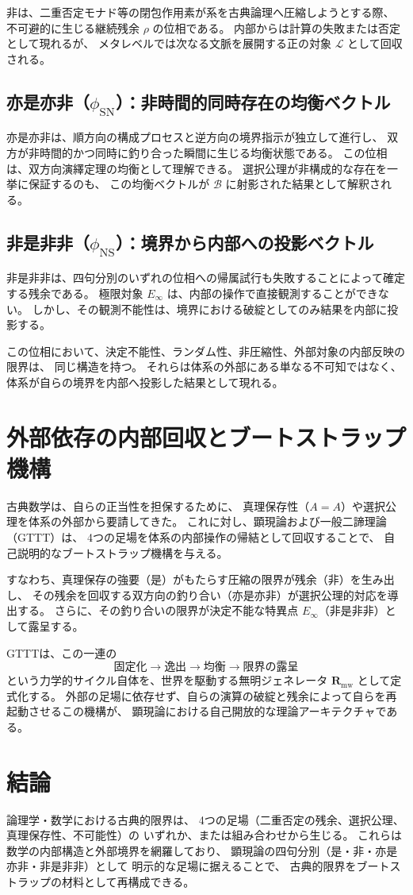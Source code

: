 \documentclass[11pt,a4paper]{ltjsarticle}
\newcommand{\phiSN}{\phi_{\text{SN}}}
\newcommand{\phiNS}{\phi_{\text{NS}}}
\newcommand{\Einfty}{E_{\infty}}
\newcommand{\Bval}{\mathcal{B}}
\newcommand{\Lhagma}{\mathcal{L}}
\newcommand{\Rmw}{\mathbf{R}_{\mathrm{mw}}}
\begin{document}
非は、二重否定モナド等の閉包作用素が系を古典論理へ圧縮しようとする際、
不可避的に生じる継続残余 $\rho$ の位相である。
内部からは計算の失敗または否定として現れるが、
メタレベルでは次なる文脈を展開する正の対象 $\Lhagma$ として回収される。

\subsection{亦是亦非（\texorpdfstring{$\phiSN$}{phiSN}）：非時間的同時存在の均衡ベクトル}

亦是亦非は、順方向の構成プロセスと逆方向の境界指示が独立して進行し、
双方が非時間的かつ同時に釣り合った瞬間に生じる均衡状態である。
この位相は、双方向演繹定理の均衡として理解できる。
選択公理が非構成的な存在を一挙に保証するのも、
この均衡ベクトルが $\Bval$ に射影された結果として解釈される。

\subsection{非是非非（\texorpdfstring{$\phiNS$}{phiNS}）：境界から内部への投影ベクトル}

非是非非は、四句分別のいずれの位相への帰属試行も失敗することによって確定する残余である。
極限対象 $\Einfty$ は、内部の操作で直接観測することができない。
しかし、その観測不能性は、境界における破綻としてのみ結果を内部に投影する。

この位相において、決定不能性、ランダム性、非圧縮性、外部対象の内部反映の限界は、
同じ構造を持つ。
それらは体系の外部にある単なる不可知ではなく、
体系が自らの境界を内部へ投影した結果として現れる。

\section{外部依存の内部回収とブートストラップ機構}

古典数学は、自らの正当性を担保するために、
真理保存性（$A=A$）や選択公理を体系の外部から要請してきた。
これに対し、顕現論および一般二諦理論（GTTT）は、
4つの足場を体系の内部操作の帰結として回収することで、
自己説明的なブートストラップ機構を与える。

すなわち、真理保存の強要（是）がもたらす圧縮の限界が残余（非）を生み出し、
その残余を回収する双方向の釣り合い（亦是亦非）が選択公理的対応を導出する。
さらに、その釣り合いの限界が決定不能な特異点 $\Einfty$（非是非非）として露呈する。

GTTTは、この一連の
\begin{equation}
  \text{固定化} \longrightarrow \text{逸出} \longrightarrow
  \text{均衡} \longrightarrow \text{限界の露呈}
\end{equation}
という力学的サイクル自体を、世界を駆動する無明ジェネレータ $\Rmw$ として定式化する。
外部の足場に依存せず、自らの演算の破綻と残余によって自らを再起動させるこの機構が、
顕現論における自己開放的な理論アーキテクチャである。

\section{結論}

論理学・数学における古典的限界は、
4つの足場（二重否定の残余、選択公理、真理保存性、不可能性）の
いずれか、または組み合わせから生じる。
これらは数学の内部構造と外部境界を網羅しており、
顕現論の四句分別（是・非・亦是亦非・非是非非）として
明示的な足場に据えることで、
古典的限界をブートストラップの材料として再構成できる。
\end{document}
